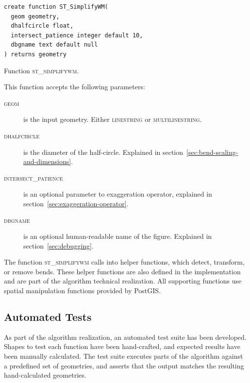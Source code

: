 \documentclass[a4paper]{article}
\begin{document}
\begin{listing}
\begin{verbatim}
create function ST_SimplifyWM(
  geom geometry,
  dhalfcircle float,
  intersect_patience integer default 10,
  dbgname text default null
) returns geometry
    \end{verbatim}
    \caption{Function \textsc{st\_simplifywm}.}
    \label{lst:st-simplifywm}
\end{listing}

This function accepts the following parameters:
\begin{description}

    \item[\normalfont\textsc{geom}] is the input geometry. Either
        \textsc{linestring} or \textsc{multilinestring}.

    \item[\normalfont\textsc{dhalfcircle}] is the diameter of the half-circle.
        Explained in section~\ref{sec:bend-scaling-and-dimensions}.

    \item[\normalfont\textsc{intersect\_patience}] is an optional parameter to
        exaggeration operator, explained in
        section~\ref{sec:exaggeration-operator}.

    \item[\normalfont\textsc{dbgname}] is an optional human-readable name of
        the figure. Explained in section~\ref{sec:debugging}.

\end{description}

The function \textsc{st\_simplifywm} calls into helper functions, which detect,
transform, or remove bends. These helper functions are also defined in the
implementation and are part of the algorithm technical realization. All
supporting functions use spatial manipulation functions provided by PostGIS.

\subsection{Automated Tests}
\label{sec:automated-tests}

As part of the algorithm realization, an automated test suite has been
developed. Shapes to test each function have been hand-crafted, and expected
results have been manually calculated. The test suite executes parts of the
algorithm against a predefined set of geometries, and asserts that the output
matches the resulting hand-calculated geometries.
\end{document}
